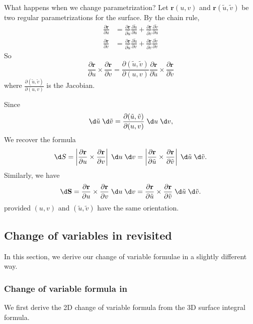 \documentclass[a4paper]{article}
\begin{document}
What happens when we change parametrization? Let $\mathbf{r}(u, v)$ and $\mathbf{r}(\tilde{u}, \tilde{v})$ be two regular parametrizations for the surface. By the chain rule,
\begin{align*}
  \frac{\partial \mathbf{r}}{\partial u} &= \frac{\partial \mathbf{r}}{\partial \tilde{u}}\frac{\partial\tilde{u}}{\partial u} + \frac{\partial \mathbf{r}}{\partial \tilde{v}}\frac{\partial\tilde{v}}{\partial u}\\
  \frac{\partial \mathbf{r}}{\partial v} &= \frac{\partial \mathbf{r}}{\partial \tilde{u}}\frac{\partial\tilde{u}}{\partial v} + \frac{\partial \mathbf{r}}{\partial \tilde{v}}\frac{\partial\tilde{v}}{\partial v}
\end{align*}
So
\[
  \frac{\partial \mathbf{r}}{\partial u}\times\frac{\partial\mathbf{r}}{\partial v} = \frac{\partial (\tilde{u}, \tilde{v})}{\partial (u, v)} \frac{\partial \mathbf{r}}{\partial \tilde {u}}\times\frac{\partial\mathbf{r}}{\partial \tilde{v}}
\]
where $\frac{\partial (\tilde{u}, \tilde{v})}{\partial(u, v)}$ is the Jacobian.

Since
\[
  \d \tilde{u}\;\d \tilde{v} = \frac{\partial (\tilde{u}, \tilde{v})}{\partial (u, v)}\;\d u\;\d v,
\]
We recover the formula
\[
  \d S = \left|\frac{\partial \mathbf{r}}{\partial u}\times\frac{\partial\mathbf{r}}{\partial v}\right|\;\d u\;\d v = \left|\frac{\partial \mathbf{r}}{\partial \tilde {u}}\times\frac{\partial\mathbf{r}}{\partial \tilde{v}}\right| \;\d \tilde{u}\;\d \tilde{v}.
\]
Similarly, we have
\[
  \d \mathbf{S} = \frac{\partial \mathbf{r}}{\partial u}\times\frac{\partial\mathbf{r}}{\partial v}\;\d u\;\d v = \frac{\partial \mathbf{r}}{\partial \tilde {u}}\times\frac{\partial\mathbf{r}}{\partial \tilde{v}} \;\d \tilde{u}\;\d \tilde{v}.
\]
provided $(u, v)$ and $(\tilde{u}, \tilde{v})$ have the same orientation.
\subsection{Change of variables in  revisited}
In this section, we derive our change of variable formulae in a slightly different way.

\subsubsection*{Change of variable formula in }
We first derive the 2D change of variable formula from the 3D surface integral formula.
\end{document}
